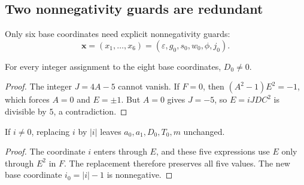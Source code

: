 \subsection{Two nonnegativity guards are redundant}

Only six base coordinates need explicit nonnegativity guards:
\[
 \mathbf x=(x_1,\ldots,x_6)
          =(\varepsilon,g_0,s_0,w_0,\phi,j_0).
\]

\begin{lemma}
\label{i17:denominator}
For every integer assignment to the eight base coordinates, $D_0\ne0$.
\end{lemma}
\begin{proof}
The integer $J=4A-5$ cannot vanish. If $F=0$, then
$(A^2-1)E^2=-1$, which forces $A=0$ and $E=\pm1$.
But $A=0$ gives $J=-5$, so $E=iJDC^2$ is divisible by $5$, a contradiction.
\end{proof}

\begin{lemma}
\label{i17:signed-i}
If $i\ne0$, replacing $i$ by $|i|$ leaves
$a_0,a_1,D_0,T_0,m$ unchanged.
\end{lemma}
\begin{proof}
The coordinate $i$ enters through $E$, and these five expressions use
$E$ only through $E^2$ in $F$. The replacement therefore preserves all
five values. The new base coordinate $i_0=|i|-1$ is nonnegative.
\end{proof}


